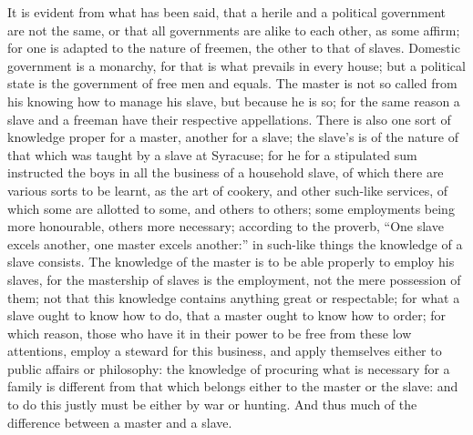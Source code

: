 It is evident from what has been said, that a herile and a political
government are not the same, or that all governments are alike to each
other, as some affirm; for one is adapted to the nature of freemen, the
other to that of slaves. Domestic government is a monarchy, for that is
what prevails in every house; but a political state is the government of
free men and equals. The master is not so called from his knowing how to
manage his slave, but because he is so; for the same reason a slave and a
freeman have their respective appellations. There is also one sort of
knowledge proper for a master, another for a slave; the slave's is of the
nature of that which was taught by a slave at Syracuse; for he for a
stipulated sum instructed the boys in all the business of a household
slave, of which there are various sorts to be learnt, as the art of
cookery, and other such-like services, of which some are allotted to some,
and others to others; some employments being more honourable, others more
necessary; according to the proverb, ``One slave excels another, one master
excels another:'' in such-like things the knowledge of a slave consists.
The knowledge of the master is to be able properly to employ his slaves,
for the mastership of slaves is the employment, not the mere possession of
them; not that this knowledge contains anything great or respectable; for
what a slave ought to know how to do, that a master ought to know how to
order; for which reason, those who have it in their power to be free from
these low attentions, employ a steward for this business, and apply
themselves either to public affairs or philosophy: the knowledge of
procuring what is necessary for a family is different from that which
belongs either to the master or the slave: and to do this justly must be
either by war or hunting. And thus much of the difference between a master
and a slave.


